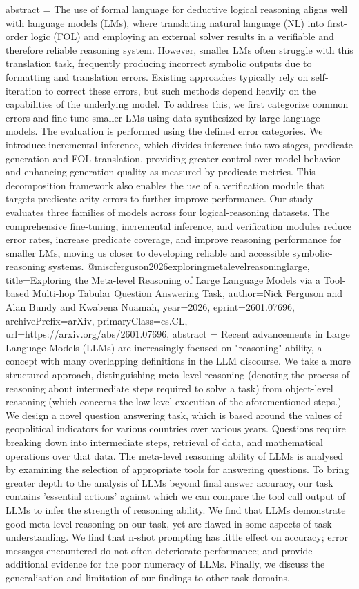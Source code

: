{      abstract = {The use of formal language for deductive logical reasoning aligns well with language models (LMs), where translating natural language (NL) into first-order logic (FOL) and employing an external solver results in a verifiable and therefore reliable reasoning system. However, smaller LMs often struggle with this translation task, frequently producing incorrect symbolic outputs due to formatting and translation errors. Existing approaches typically rely on self-iteration to correct these errors, but such methods depend heavily on the capabilities of the underlying model. To address this, we first categorize common errors and fine-tune smaller LMs using data synthesized by large language models. The evaluation is performed using the defined error categories. We introduce incremental inference, which divides inference into two stages, predicate generation and FOL translation, providing greater control over model behavior and enhancing generation quality as measured by predicate metrics. This decomposition framework also enables the use of a verification module that targets predicate-arity errors to further improve performance. Our study evaluates three families of models across four logical-reasoning datasets. The comprehensive fine-tuning, incremental inference, and verification modules reduce error rates, increase predicate coverage, and improve reasoning performance for smaller LMs, moving us closer to developing reliable and accessible symbolic-reasoning systems.}
}@misc{ferguson2026exploringmetalevelreasoninglarge,
      title={Exploring the Meta-level Reasoning of Large Language Models via a Tool-based Multi-hop Tabular Question Answering Task}, 
      author={Nick Ferguson and Alan Bundy and Kwabena Nuamah},
      year={2026},
      eprint={2601.07696},
      archivePrefix={arXiv},
      primaryClass={cs.CL},
      url={https://arxiv.org/abs/2601.07696},
      abstract = {Recent advancements in Large Language Models (LLMs) are increasingly focused on "reasoning" ability, a concept with many overlapping definitions in the LLM discourse. We take a more structured approach, distinguishing meta-level reasoning (denoting the process of reasoning about intermediate steps required to solve a task) from object-level reasoning (which concerns the low-level execution of the aforementioned steps.) We design a novel question answering task, which is based around the values of geopolitical indicators for various countries over various years. Questions require breaking down into intermediate steps, retrieval of data, and mathematical operations over that data. The meta-level reasoning ability of LLMs is analysed by examining the selection of appropriate tools for answering questions. To bring greater depth to the analysis of LLMs beyond final answer accuracy, our task contains 'essential actions' against which we can compare the tool call output of LLMs to infer the strength of reasoning ability. We find that LLMs demonstrate good meta-level reasoning on our task, yet are flawed in some aspects of task understanding. We find that n-shot prompting has little effect on accuracy; error messages encountered do not often deteriorate performance; and provide additional evidence for the poor numeracy of LLMs. Finally, we discuss the generalisation and limitation of our findings to other task domains.}
}
